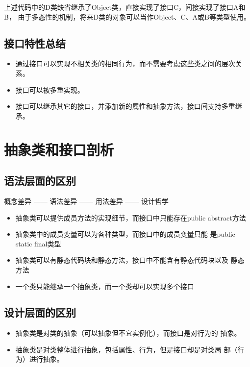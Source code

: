 上述代码中的D类缺省继承了Object类，直接实现了接口C，间接实现了接口A和B，
由于多态性的机制，将来D类的对象可以当作Object、C、A或B等类型使用。


\subsection{接口特性总结}

\begin{itemize}
\item 通过接口可以实现不相关类的相同行为，而不需要考虑这些类之间的层次关系。
\item 接口可以被多重实现。
\item 接口可以继承其它的接口，并添加新的属性和抽象方法，接口间支持多重继承。
\end{itemize}

\section{抽象类和接口剖析}

\subsection{语法层面的区别}

{\centering\hei\centering 概念差异 —— 语法差异 —— 用法差异 —— 设计哲学}

\begin{itemize}
\item 抽象类可以提供成员方法的实现细节，而接口中只能存在public
  abstract方法
\item 抽象类中的成员变量可以为各种类型，而接口中的成员变量只能
  是public static final类型
\item 抽象类可以有静态代码块和静态方法，接口中不能含有静态代码块以及
  静态方法
\item 一个类只能继承一个抽象类，而一个类却可以实现多个接口
\end{itemize}

\subsection{设计层面的区别}

\begin{itemize}
\item 抽象类是对类的抽象（可以抽象但不宜实例化），而接口是对行为的
  抽象。
\item 抽象类是对类整体进行抽象，包括属性、行为，但是接口却是对类局
  部（行为）进行抽象。
\end{itemize}



